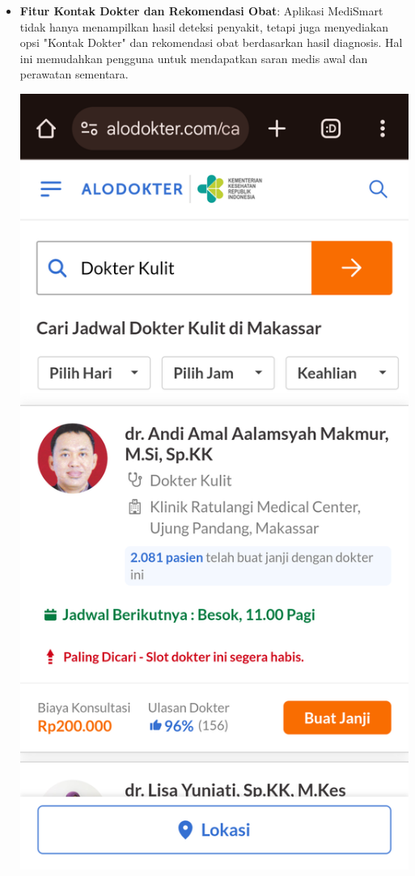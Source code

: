 \documentclass[journal,article,submit,pdftex,moreauthors]{Definitions/mdpi}
\begin{document}
\begin{itemize}
\begin{itemize}
        \vspace{10}
        
        \item \textbf{Fitur Kontak Dokter dan Rekomendasi Obat}: Aplikasi MediSmart tidak hanya menampilkan hasil deteksi penyakit, tetapi juga menyediakan opsi "Kontak Dokter" dan rekomendasi obat berdasarkan hasil diagnosis. Hal ini memudahkan pengguna untuk mendapatkan saran medis awal dan perawatan sementara.

        \vspace{10}

        \hspace{4em}
        \begin{minipage}{0.25\textwidth}
            \centering
            \includegraphics[width=\textwidth]{images/a6.png}

\end{minipage}
\end{itemize}
\end{itemize}
\end{document}
